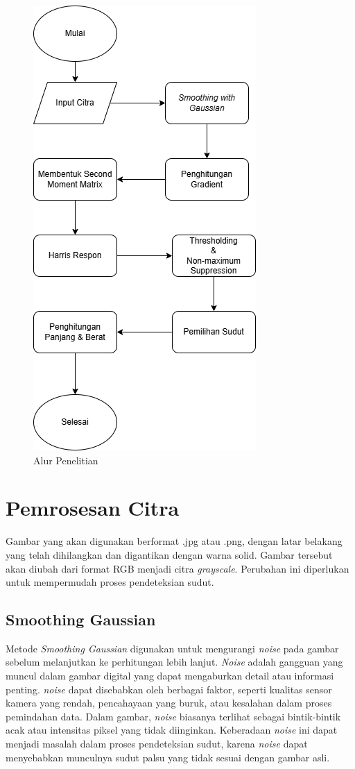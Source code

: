 \begin{figure}
    \centering
    \includegraphics[scale= 0.6]{gambar/Flowchar Penetianv2.png}
    \caption{Alur Penelitian}
    \label{Alur Penelitian}
\end{figure}

\section{Pemrosesan Citra}
    Gambar yang akan digunakan berformat .jpg atau .png, dengan latar belakang yang telah dihilangkan dan digantikan dengan warna solid. 
Gambar tersebut akan diubah dari format RGB menjadi citra \emph{grayscale}. Perubahan ini diperlukan untuk mempermudah proses pendeteksian sudut. 


\subsection{Smoothing Gaussian}
    Metode \emph{Smoothing Gaussian} digunakan untuk mengurangi \emph{noise} pada gambar sebelum melanjutkan ke perhitungan lebih lanjut.
\emph{Noise} adalah gangguan yang muncul dalam gambar digital yang dapat mengaburkan detail atau informasi penting. \emph{noise} dapat disebabkan oleh berbagai faktor, seperti kualitas sensor kamera yang rendah, pencahayaan yang buruk, atau kesalahan dalam proses pemindahan data.
Dalam gambar, \emph{noise} biasanya terlihat sebagai bintik-bintik acak atau intensitas piksel yang tidak diinginkan. Keberadaan \emph{noise} ini dapat menjadi masalah dalam proses pendeteksian sudut, karena \emph{noise} dapat menyebabkan munculnya sudut palsu yang tidak sesuai dengan gambar asli.
    
